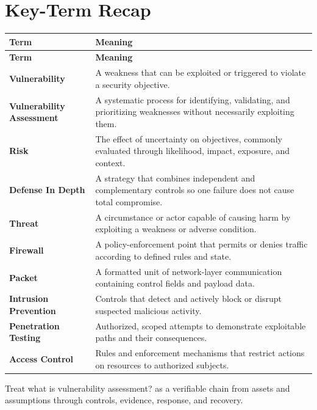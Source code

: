\documentclass[11pt]{article}
\begin{document}
\section*{Key-Term Recap}
\begin{longtable}{>{\RaggedRight\arraybackslash}p{}>{\RaggedRight\arraybackslash}p{}}
\toprule\rowcolor{Navy}\color{white}\textbf{Term} & \color{white}\textbf{Meaning}\\\midrule
\endfirsthead
\toprule\rowcolor{Navy}\color{white}\textbf{Term} & \color{white}\textbf{Meaning}\\\midrule
\endhead
\textbf{Vulnerability} & A weakness that can be exploited or triggered to violate a security objective. \\\midrule
\textbf{Vulnerability Assessment} & A systematic process for identifying, validating, and prioritizing weaknesses without necessarily exploiting them. \\\midrule
\textbf{Risk} & The effect of uncertainty on objectives, commonly evaluated through likelihood, impact, exposure, and context. \\\midrule
\textbf{Defense In Depth} & A strategy that combines independent and complementary controls so one failure does not cause total compromise. \\\midrule
\textbf{Threat} & A circumstance or actor capable of causing harm by exploiting a weakness or adverse condition. \\\midrule
\textbf{Firewall} & A policy-enforcement point that permits or denies traffic according to defined rules and state. \\\midrule
\textbf{Packet} & A formatted unit of network-layer communication containing control fields and payload data. \\\midrule
\textbf{Intrusion Prevention} & Controls that detect and actively block or disrupt suspected malicious activity. \\\midrule
\textbf{Penetration Testing} & Authorized, scoped attempts to demonstrate exploitable paths and their consequences. \\\midrule
\textbf{Access Control} & Rules and enforcement mechanisms that restrict actions on resources to authorized subjects. \\\midrule
\bottomrule
\end{longtable}
\begin{takeawaybox}
Treat what is vulnerability assessment? as a verifiable chain from assets and assumptions through controls, evidence, response, and recovery.
\end{takeawaybox}
\end{document}
